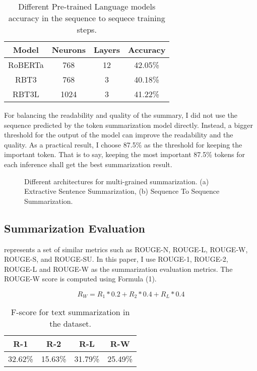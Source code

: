 \documentclass[11pt,a4paper]{article}
\begin{document}
\begin{table}
\centering
\begin{tabular}{cccc}
\hline
\textbf{Model} & \textbf{Neurons}& \textbf{Layers} & \textbf{Accuracy} \\
\hline
RoBERTa & 768 & 12 & 42.05\% \\
RBT3 & 768 & 3 & 40.18\% \\
RBT3L & 1024 & 3 & 41.22\% \\
\hline
\end{tabular}
\caption{Different Pre-trained Language models accuracy in the sequence to sequece training steps.}
\end{table}


For balancing the readability and quality of the summary, I did not use the sequence predicted by the token summarization model directly.
Instead, a bigger threshold for the output of the model can improve the readability and the quality.
As a practical result, I choose 87.5\% as the threshold for keeping the important token.
That is to say, keeping the most important 87.5\% tokens for each inference shall get the best summarization result.

\begin{figure*}
\begin{center}
\end{center}
   \caption{Different architectures for multi-grained summarization.
   (a) Extractive Sentence Summarization,
   (b) Sequence To Sequence Summarization.}
\label{fig:short}
\end{figure*}

\subsection{Summarization Evaluation}

\citet{lin2004rouge} represents a set of similar metrics such as ROUGE-N, ROUGE-L, ROUGE-W, ROUGE-S, and ROUGE-SU.
In this paper, I use ROUGE-1, ROUGE-2, ROUGE-L and ROUGE-W as the summarization evaluation metrics.
The ROUGE-W score is computed using Formula (1).

\begin{equation}
  {R_W} = {R_1} * 0.2 + {R_2} * 0.4 + {R_L} * 0.4
\end{equation}

\begin{table}
\centering
\begin{tabular}{cccc}
\hline
\textbf{R-1} & \textbf{R-2} & \textbf{R-L} & \textbf{R-W} \\
\hline
32.62\% & 15.63\% & 31.79\% & 25.49\% \\
\hline
\end{tabular}
\caption{F-score for text summarization in the dataset.}
\end{table}
\end{document}
